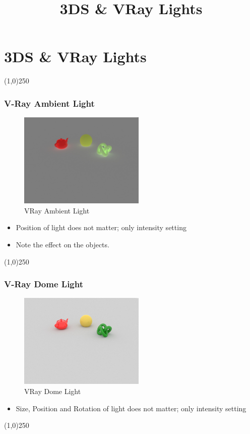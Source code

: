 \section{3DS \& VRay Lights}
\begin{frame}
\title[3DS \& VRay Lights]{3DS \& VRay Lights}
\titlepage
\end{frame}\begin{center}\line(1,0){250}\end{center}


\begin{frame}
	\frametitle{V-Ray Ambient Light}
	\begin{figure}
		\centering
		\includegraphics[height=4.5cm]{./Lights/Ambient}
		\caption{VRay Ambient Light}
		\label{fig:AmbientLight}
	\end{figure}
	\begin{itemize}
		\item Position of light does not matter; only intensity setting
		\item Note the effect on the objects.
	\end{itemize}
\end{frame}
\begin{center}\line(1,0){250}\end{center}



\begin{frame}
	\frametitle{V-Ray Dome Light}
	\begin{figure}
		\centering
		\includegraphics[height=4.5cm]{./Lights/DomeLight}
		\caption{VRay Dome Light}
		\label{fig:DomeLight}
	\end{figure}
	\begin{itemize}
		\item Size, Position and Rotation of light does not matter; only intensity setting
	\end{itemize}
\end{frame}
\begin{center}\line(1,0){250}\end{center}





